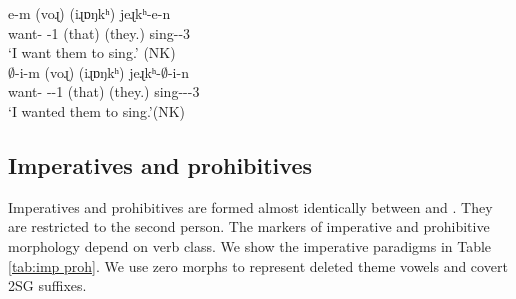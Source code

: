	\begin{exe}
		\ex \label{sent:Verb:Synthn:Subj:ex}
		\begin{xlist}
			
			\ex {} {e-m} {(voɻ)} {(iɻɒŋkʰ)} {jeɻkʰ-e-n}
			\\
			want-{\impfcvb} {\auxgloss}-1{\sg} (that) (they.{\nom}) sing-{\thgloss}-3{\pl}
			\\
			\trans 		`I want them to sing.' \hfill (NK)
			\\
			\ex {} {$\emptyset$-i-m} {(voɻ)} {(iɻɒŋkʰ)} {jeɻkʰ-$\emptyset$-i-n}
			\\
			want-{\impfcvb} {\auxgloss}-{\pst}-1{\sg} (that) (they.{\nom}) sing-{\thgloss}-{\pst}-3{\pl}
			\\
			\trans 			`I wanted them to sing.'\hfill (NK)
			\\
		\end{xlist}
		
	\end{exe}
	

	
	\subsection{Imperatives and prohibitives}\label{section:verb:synthesis:imp}
	
	Imperatives and prohibitives are formed almost identically between {\seaSE} and {\iaIA}. They are restricted to the second person. The markers of imperative and prohibitive morphology depend on verb class. We show the imperative paradigms in Table \ref{tab:imp proh}. We use zero morphs to represent deleted theme vowels and covert 2SG suffixes.
	
